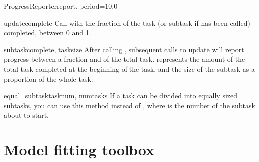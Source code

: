 \documentclass[letterpaper,10pt,english]{manual}
\begin{document}
\begin{classdesc}{ProgressReporter}{report, period=10.0}
\hypertarget{brian.ProgressReporter.update}{}\begin{methoddesc}{update}{complete}
Call with the fraction of the task (or subtask if
 has been called) completed, between
0 and 1.
\end{methoddesc}

\hypertarget{brian.ProgressReporter.subtask}{}\begin{methoddesc}{subtask}{complete, tasksize}
After calling ,
subsequent calls to update will report progress
between a fraction  and 
of the total task.  represents the amount
of the total task completed at the beginning of the
task, and  the size of the subtask as a
proportion of the whole task.
\end{methoddesc}

\hypertarget{brian.ProgressReporter.equal_subtask}{}\begin{methoddesc}{equal\_subtask}{tasknum, numtasks}
If a task can be divided into  equally
sized subtasks, you can use this method instead of
, where  is the number of
the subtask about to start.
\end{methoddesc}
\end{classdesc}

\resetcurrentobjects
\hypertarget{--doc-reference-modelfitting}{}

\section{Model fitting toolbox}
\end{document}
